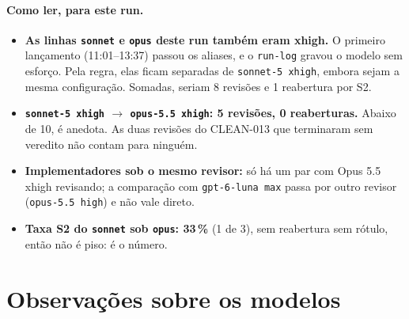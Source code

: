 \documentclass[11pt,a4paper]{article}
\begin{document}
\medskip
{}

\paragraph{Como ler, para este run.}
\begin{itemize}
  \item \textbf{As linhas \texttt{sonnet} e \texttt{opus} deste run também
        eram xhigh.} O primeiro lançamento (11:01--13:37) passou os aliases, e o
        \texttt{run-log} gravou o modelo sem esforço. Pela regra, elas ficam
        separadas de \texttt{sonnet-5 xhigh}, embora sejam a mesma
        configuração. Somadas, seriam 8 revisões e 1 reabertura por S2.
  \item \textbf{\texttt{sonnet-5 xhigh} $\to$ \texttt{opus-5.5 xhigh}: 5
        revisões, 0 reaberturas.} Abaixo de 10, é anedota. As duas revisões do
        CLEAN-013 que terminaram sem veredito não contam para ninguém.
  \item \textbf{Implementadores sob o mesmo revisor:} só há um par com Opus 5.5
        xhigh revisando; a comparação com \texttt{gpt-6-luna max} passa por
        outro revisor (\texttt{opus-5.5 high}) e não vale direto.
  \item \textbf{Taxa S2 do \texttt{sonnet} sob \texttt{opus}: 33\,\%} (1 de 3),
        sem reabertura sem rótulo, então não é piso: é o número.
\end{itemize}

\section{Observações sobre os modelos}
\end{document}
